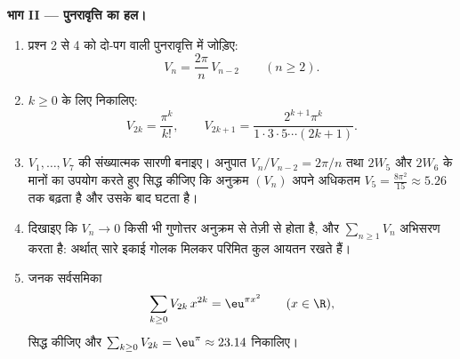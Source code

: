 \begin{problem}[{सप्ताहांत समस्या --- $V_n =
\pi^{n/2}/\Gamma(\frac n2 + 1)$, और ऊँची विमाओं की विचित्रता}]
\medskip
\noindent\textbf{भाग II --- पुनरावृत्ति का हल।}
\begin{enumerate}[resume]
  \item प्रश्न 2 से 4 को दो-पग वाली पुनरावृत्ति में जोड़िए:
        \[
        V_n = \frac{2\pi}{n}\,V_{n-2}
        \qquad (n \geq 2).
        \]
  \item $k \geq 0$ के लिए  निकालिए:
        \[
        V_{2k} = \frac{\pi^k}{k!},
        \qquad
        V_{2k+1} = \frac{2^{k+1}\pi^k}{1\cdot3\cdot5\cdots
        (2k+1)} .
        \]
  \item $V_1, \dots, V_7$ की संख्यात्मक सारणी बनाइए। अनुपात $V_n/V_{n-2} = 2\pi/n$ तथा $2W_5$ और
        $2W_6$ के मानों का उपयोग करते हुए सिद्ध कीजिए कि अनुक्रम
        $(V_n)$ अपने अधिकतम $V_5 = \frac{8\pi^2}{15} \approx
        5.26$ तक बढ़ता है और उसके बाद घटता है।
  \item दिखाइए कि $V_n \to 0$ किसी भी गुणोत्तर अनुक्रम से तेज़ी से
        होता है, और $\sum_{n\geq1} V_n$ अभिसरण करता है: अर्थात् सारे इकाई
        गोलक मिलकर परिमित कुल आयतन रखते हैं।
  \item जनक सर्वसमिका
        \[
        \sum_{k\geq0} V_{2k}\,x^{2k} = \eu^{\pi x^2}
        \qquad (x \in \R),
        \]
        सिद्ध कीजिए और $\sum_{k\geq0}V_{2k} = \eu^\pi \approx
        23.14$ निकालिए।
\end{enumerate}


\end{problem}
